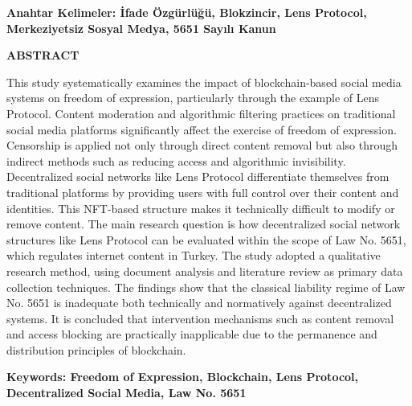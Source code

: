 \documentclass[11pt,a4paper]{article}
\begin{document}
\vspace{1em}

\noindent\fontsize{11}{13}\selectfont\bfseries Anahtar Kelimeler: \normalfont İfade Özgürlüğü, Blokzincir, Lens Protocol, Merkeziyetsiz Sosyal Medya, 5651 Sayılı Kanun

\vspace{1em}

\noindent\fontsize{11}{13}\selectfont\bfseries ABSTRACT

\vspace{0.5em}

\fontsize{11}{13}\selectfont\normalfont
\setlength{\parindent}{0.75cm}
\justify
This study systematically examines the impact of blockchain-based social media systems on freedom of expression, particularly through the example of Lens Protocol. Content moderation and algorithmic filtering practices on traditional social media platforms significantly affect the exercise of freedom of expression. Censorship is applied not only through direct content removal but also through indirect methods such as reducing access and algorithmic invisibility. Decentralized social networks like Lens Protocol differentiate themselves from traditional platforms by providing users with full control over their content and identities. This NFT-based structure makes it technically difficult to modify or remove content. The main research question is how decentralized social network structures like Lens Protocol can be evaluated within the scope of Law No. 5651, which regulates internet content in Turkey. The study adopted a qualitative research method, using document analysis and literature review as primary data collection techniques. The findings show that the classical liability regime of Law No. 5651 is inadequate both technically and normatively against decentralized systems. It is concluded that intervention mechanisms such as content removal and access blocking are practically inapplicable due to the permanence and distribution principles of blockchain.

\vspace{1em}

\noindent\fontsize{11}{13}\selectfont\bfseries Keywords: \normalfont Freedom of Expression, Blockchain, Lens Protocol, Decentralized Social Media, Law No. 5651

\newpage

\end{document}
